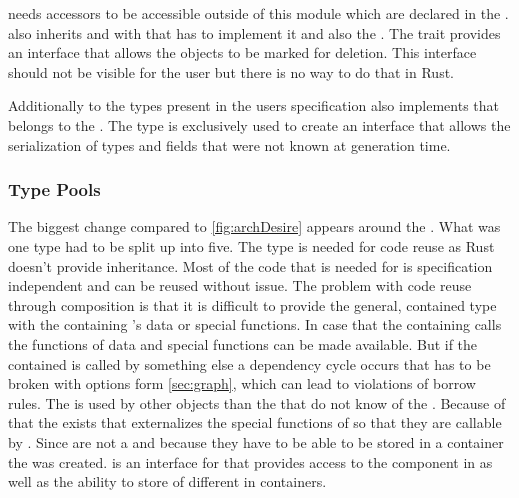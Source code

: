 \documentclass[thesis]{subfiles}
\begin{document}
      \age needs accessors to be accessible outside of this module which are declared in the \AgeObject \trait.
      \AgeObject also inherits \SkillObject and with that has to implement it and also the \Deleteable \trait.
      The \Deleteable trait provides an interface that allows the objects to be marked for deletion.
      This interface should not be visible for the user but there is no way to do that in Rust.

      Additionally to the types present in the users specification \Age also implements \linebreak
      \ForeignObject that belongs to the \Foreign \struct.
      The \Foreign type is exclusively used to create an interface that allows the serialization of types and fields that were not known at generation time.


    \subsubsection{Type Pools}
      The biggest change compared to \autoref{fig:archDesire} appears around the \UserTypePool.
      What was one type had to be split up into five.
      The \Pool type is needed for code reuse as Rust doesn't provide inheritance.
      Most of the code that is needed for \UserTypePools is specification independent and can be reused without issue.
      The problem with code reuse through composition is that it is difficult to provide the general, contained type with the containing \struct's data or special functions.
      In case that the containing \struct calls the functions of \Pool data and special functions can be made available.
      But if the contained \struct is called by something else a dependency cycle occurs that has to be broken with options form \autoref{sec:graph}, which can lead to violations of borrow rules.
      The \Pool is used by other objects than the \UserTypePools that do not know of the \UserTypePools.
      Because of that the \UserPartsMaker exists that externalizes the special functions of \UserTypePool so that they are callable by \Pool.
      Since \UserTypePools are not a \Pool and because they have to be able to be stored in a container the \PoolProxy \trait was created.
      \PoolProxy is an interface for \UserTypePools that provides access to the \Pool component in \UserTypePools as well as the ability to store \UserTypePools of different \UserTypes in containers.
\end{document}

